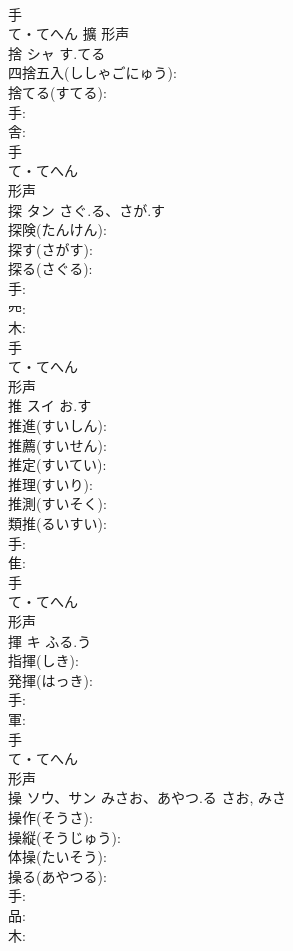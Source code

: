 \documentclass[8pt]{extreport}
\begin{document}
\begin{CJK}{UTF8}{min}
\\	手	
\\	て・てへん	擴	形声 
\\	捨	シャ	す.てる		
\\	四捨五入(ししゃごにゅう): 
\\	捨てる(すてる): 
\\	手: 
\\	舎: 
\\	手	
\\	て・てへん	
\\	形声 
\\	探	タン	さぐ.る、さが.す		
\\	探険(たんけん): 
\\	探す(さがす): 
\\	探る(さぐる): 
\\	手: 
\\	㓁: 
\\	木: 
\\	手	
\\	て・てへん	
\\	形声 
\\	推	スイ	お.す		
\\	推進(すいしん): 
\\	推薦(すいせん): 
\\	推定(すいてい): 
\\	推理(すいり): 
\\	推測(すいそく): 
\\	類推(るいすい): 
\\	手: 
\\	隹: 
\\	手	
\\	て・てへん	
\\	形声 
\\	揮	キ	ふる.う		
\\	指揮(しき): 
\\	発揮(はっき): 
\\	手: 
\\	軍: 
\\	手	
\\	て・てへん	
\\	形声 
\\	操	ソウ、サン	みさお、あやつ.る	さお, みさ	
\\	操作(そうさ): 
\\	操縦(そうじゅう): 
\\	体操(たいそう): 
\\	操る(あやつる): 
\\	手: 
\\	品: 
\\	木: 

\end{CJK}
\end{document}
